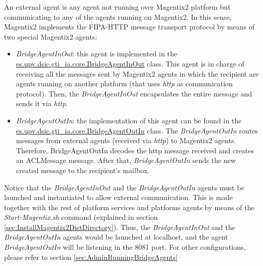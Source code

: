 An external agent is any agent not running over Magentix2  platform but communicating to any of the agents running on Magentix2. In this sense, Magentix2 implements the FIPA-HTTP message transport protocol  by means of two special Magentix2 agents:
\begin{itemize}
\item \textit{BridgeAgentInOut}: this agent is implemented in the  \url{es.upv.dsic.gti_ia.core.BridgeAgentInOut} class. This agent is in charge of receiving all the messages sent by Magentix2 agents in which the recipient are agents running on another platform (that uses \textit{http} as communication protocol). Then, the \textit{BridgeAgentInOut} encapsulates the entire message and sends it via \textit{http}.

\item \textit{BridgeAgentOutIn}: the implementation of this agent can be found in the \url{es.upv.dsic.gti_ia.core.BridgeAgentOutIn} class. The  \textit{BridgeAgentOutIn} routes messages from external agents (received via \textit{http}) to Magentix2 agents. Therefore, BridgeAgentOutIn decodes the http message received and creates an ACLMessage message. After that, \textit{BridgeAgentOutIn} sends the new created message to the recipient's mailbox.
\end{itemize}


Notice that the \textit{BridgeAgentInOut} and the \textit{BridgeAgentOutIn} agents must be launched and instantiated to allow external communication. This is made together with the rest of platform services and platforms agents by means of the \textit{Start-Magentix.sh} command (explained in section \ref{sec:InstallMagentix2DistDirectory}). %
Thus, the \textit{BridgeAgentInOut} and the \textit{BridgeAgentOutIn} agents would be launched at localhost, and the agent \textit{BridgeAgentOutIn} will be listening in the 8081 port. For other configurations, please refer to section \ref{sec:AdminRunningBridgeAgents}



